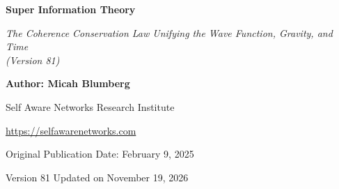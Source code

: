 \documentclass[american,11pt,letterpaper]{article}
\author{}
\date{}
\begin{document}
\begin{center}
{\LARGE\bfseries Super Information Theory\par}
\vspace{0.35em}
{\large\itshape The Coherence Conservation Law Unifying the Wave Function, Gravity, and Time\\(Version 81)\par}
\vspace{0.8em}
{\small\textbf{Author: Micah Blumberg}\par}
{\small Self Aware Networks Research Institute\par}
{\small\url{https://selfawarenetworks.com}\par}
{\small Original Publication Date: February 9, 2025\par}
{\small Version 81 Updated on November 19, 2026\par}
\end{center}
\vspace{0.65em}
\end{document}
